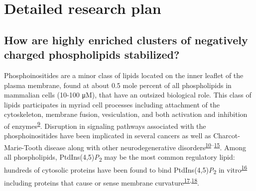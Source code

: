 \documentclass[11pt,notitlepage]{article}
\begin{document}
\hypertarget{detailed-research-plan}{%
\section{Detailed research plan}\label{detailed-research-plan}}

\hypertarget{how-are-highly-enriched-clusters-of-negatively-charged-phospholipids-stabilized}{%
\subsection{How are highly enriched clusters of negatively charged
phospholipids
stabilized?}\label{how-are-highly-enriched-clusters-of-negatively-charged-phospholipids-stabilized}}

Phosphoinositides are a minor class of lipids located on the inner
leaflet of the plasma membrane, found at about 0.5 mole percent of all
phospholipids in mammalian cells (10-100 μM), that have an outsized
biological role. This class of lipids participates in myriad cell
processes including attachment of the cytoskeleton, membrane fusion,
vesiculation, and both activation and inhibition of
enzymes\textsuperscript{\protect\hyperlink{ref-GGlssBvj}{9}}. Disruption
in signaling pathways associated with the phosphoinositides have been
implicated in several cancers as well as Charcot-Marie-Tooth disease
along with other neurodegenerative
disorders\textsuperscript{\protect\hyperlink{ref-8Xw2kuUO}{10}--\protect\hyperlink{ref-1DCzqvykg}{15}}.
Among all phospholipids, PtdIns(4,5)\emph{P}\textsubscript{2} may be the
most common regulatory lipid: hundreds of cytosolic proteins have been
found to bind PtdIns(4,5)\emph{P}\textsubscript{2} in
vitro\textsuperscript{\protect\hyperlink{ref-uyKE7bWV}{16}} including
proteins that cause or sense membrane
curvature\textsuperscript{\protect\hyperlink{ref-3EmJ4esY}{17},\protect\hyperlink{ref-5PUA7pLD}{18}}.
\end{document}
